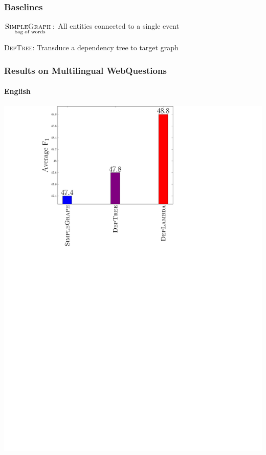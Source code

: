 \documentclass[mathserif,12pt]{beamer}
\newcommand{\hlight}[1]{{\color{blue!80} #1}}
\newcommand \deptree{\textsc{DepTree}\xspace}
\newcommand \simplegraph{\textsc{SimpleGraph}\xspace}
\newcommand \ccggraph{\textsc{CCGGraph}\xspace}
\begin{document}
\begin{frame}
\large
\frametitle{Baselines}
\hlight{$\underset{\mathrm{bag\; of\; words}}{\simplegraph:}$ }All entities connected to a single event



\vspace{2em}
\hlight{\deptree:} Transduce a dependency tree to target graph \\

\end{frame}

\begin{frame}
\frametitle{Results on Multilingual WebQuestions}
\framesubtitle{English}
\centering
\large
\vspace{0.4em}
\includegraphics[trim=9.5em 0em 23em 0.5em,clip=true,scale=0.5]{figures/deplambda_results_plot_ud}
\end{frame}
\end{document}
